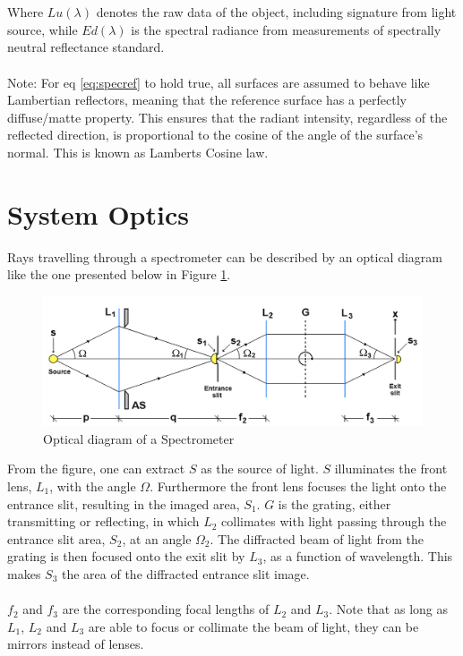 \\\\
Where $Lu(\lambda)$ denotes the raw data of the object, including signature from light source, while $Ed(\lambda)$ is the spectral radiance from measurements of spectrally neutral reflectance standard.
\\\\
Note: For eq \ref{eq:specref} to hold true, all surfaces are assumed to behave like Lambertian reflectors, meaning that the reference surface has a perfectly diffuse/matte property. This ensures that the radiant intensity, regardless of the reflected direction, is proportional to the cosine of the angle of the surface's normal. This is known as Lamberts Cosine law. 



\vspace{1.3cm}
\section{System Optics} \label{sec:sysopt}
Rays travelling through a spectrometer can be described by an optical diagram like the one presented below in Figure \ref{fig:sysopt}.
\begin{figure}[H]
    \centering
    \includegraphics[width = 12cm]{Images/theory/sysop.png}
    \caption{Optical diagram of a Spectrometer}
    \label{fig:sysopt}
\end{figure}
\noindent
From the figure, one can extract $S$ as the source of light. $S$ illuminates the front lens, $L_1$, with the angle $\Omega$. Furthermore the front lens focuses the light onto the entrance slit, resulting in the imaged area, $S_1$. $G$ is the grating, either transmitting or reflecting, in which $L_2$ collimates with light passing through the entrance slit area, $S_2$, at an angle  $\Omega_2$. The diffracted beam of light from the grating is then focused onto the exit slit by $L_3$, as a function of wavelength. This makes $S_3$ the area of the diffracted entrance slit image. 
\\\\
$f_2$ and $f_3$ are the corresponding focal lengths of $L_2$ and $L_3$. Note that as long as $L_1$, $L_2$ and $L_3$ are able to focus or collimate the beam of light, they can be mirrors instead of lenses. 

